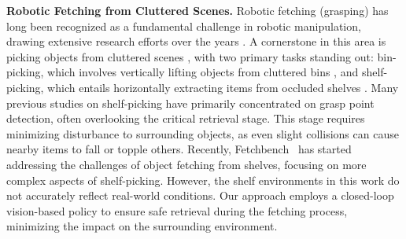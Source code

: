 \textbf{Robotic Fetching from Cluttered Scenes.} Robotic fetching (grasping) has long been recognized as a fundamental challenge in robotic manipulation, drawing extensive research efforts over the years \cite{newbury2023deep}. A cornerstone in this area is picking objects from cluttered scenes \cite{correll2016analysis,eppner2016lessons,mahler2017learning,mahler2019learning,yu2016summary,li2023sim,murray2024learning,yang2023dynamo,atar2024optigrasp,han2024fetchbench,zhang2024gamma,wang2024quadwbg}, with two primary tasks standing out: bin-picking, which involves vertically lifting objects from cluttered bins \cite{correll2016analysis,eppner2016lessons,mahler2017learning,mahler2019learning,yu2016summary,li2023sim}, and shelf-picking, which entails horizontally extracting items from occluded shelves \cite{murray2024learning,yang2023dynamo,atar2024optigrasp,han2024fetchbench}. Many previous studies on shelf-picking \cite{murray2024learning,yang2023dynamo,atar2024optigrasp} have primarily concentrated on grasp point detection, often overlooking the critical retrieval stage. This stage requires minimizing disturbance to surrounding objects, as even slight collisions can cause nearby items to fall or topple others. Recently, Fetchbench~\cite{han2024fetchbench} has started addressing the challenges of object fetching from shelves, focusing on more complex aspects of shelf-picking. However, the shelf environments in this work do not accurately reflect real-world conditions. Our approach employs a closed-loop vision-based policy to ensure safe retrieval during the fetching process, minimizing the impact on the surrounding environment.




